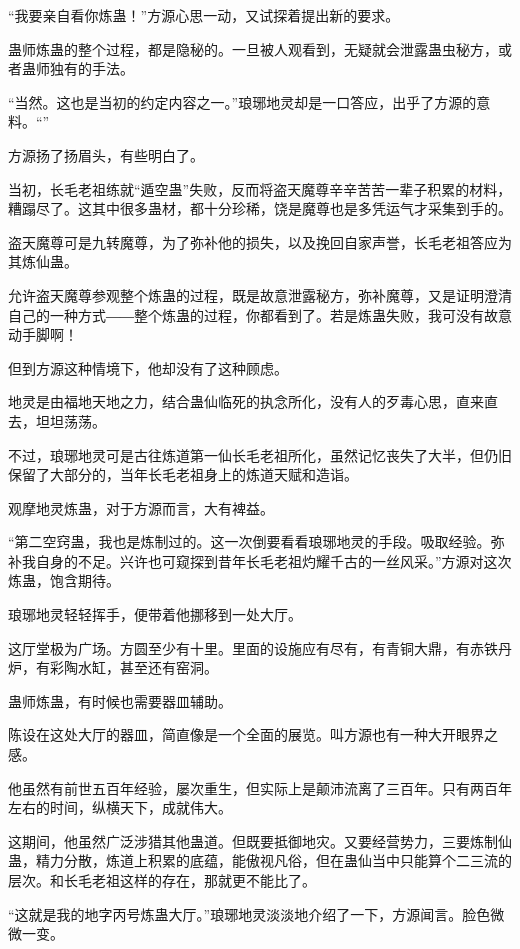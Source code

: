 
\begin{this_body}

“我要亲自看你炼蛊！”方源心思一动，又试探着提出新的要求。

蛊师炼蛊的整个过程，都是隐秘的。一旦被人观看到，无疑就会泄露蛊虫秘方，或者蛊师独有的手法。

“当然。这也是当初的约定内容之一。”琅琊地灵却是一口答应，出乎了方源的意料。“”

方源扬了扬眉头，有些明白了。

当初，长毛老祖练就“遁空蛊”失败，反而将盗天魔尊辛辛苦苦一辈子积累的材料，糟蹋尽了。这其中很多蛊材，都十分珍稀，饶是魔尊也是多凭运气才采集到手的。

盗天魔尊可是九转魔尊，为了弥补他的损失，以及挽回自家声誉，长毛老祖答应为其炼仙蛊。

允许盗天魔尊参观整个炼蛊的过程，既是故意泄露秘方，弥补魔尊，又是证明澄清自己的一种方式――整个炼蛊的过程，你都看到了。若是炼蛊失败，我可没有故意动手脚啊！

但到方源这种情境下，他却没有了这种顾虑。

地灵是由福地天地之力，结合蛊仙临死的执念所化，没有人的歹毒心思，直来直去，坦坦荡荡。

不过，琅琊地灵可是古往炼道第一仙长毛老祖所化，虽然记忆丧失了大半，但仍旧保留了大部分的，当年长毛老祖身上的炼道天赋和造诣。

观摩地灵炼蛊，对于方源而言，大有裨益。

“第二空窍蛊，我也是炼制过的。这一次倒要看看琅琊地灵的手段。吸取经验。弥补我自身的不足。兴许也可窥探到昔年长毛老祖灼耀千古的一丝风采。”方源对这次炼蛊，饱含期待。

琅琊地灵轻轻挥手，便带着他挪移到一处大厅。

这厅堂极为广场。方圆至少有十里。里面的设施应有尽有，有青铜大鼎，有赤铁丹炉，有彩陶水缸，甚至还有窑洞。

蛊师炼蛊，有时候也需要器皿辅助。

陈设在这处大厅的器皿，简直像是一个全面的展览。叫方源也有一种大开眼界之感。

他虽然有前世五百年经验，屡次重生，但实际上是颠沛流离了三百年。只有两百年左右的时间，纵横天下，成就伟大。

这期间，他虽然广泛涉猎其他蛊道。但既要抵御地灾。又要经营势力，三要炼制仙蛊，精力分散，炼道上积累的底蕴，能傲视凡俗，但在蛊仙当中只能算个二三流的层次。和长毛老祖这样的存在，那就更不能比了。

“这就是我的地字丙号炼蛊大厅。”琅琊地灵淡淡地介绍了一下，方源闻言。脸色微微一变。


\end{this_body}
